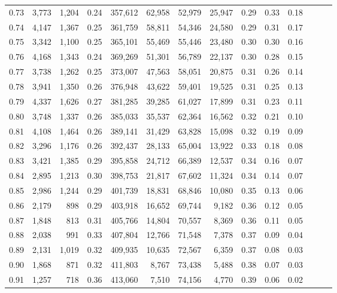 \begin{tabular}{rrrrrrrrrrrrrr}
0.73 &  3,773 &  1,204 &  0.24 &  357,612 &   62,958 &  52,979 &  25,947 &  0.29 &  0.33 &      0.18 \\
0.74 &  4,147 &  1,367 &  0.25 &  361,759 &   58,811 &  54,346 &  24,580 &  0.29 &  0.31 &      0.17 \\
0.75 &  3,342 &  1,100 &  0.25 &  365,101 &   55,469 &  55,446 &  23,480 &  0.30 &  0.30 &      0.16 \\
0.76 &  4,168 &  1,343 &  0.24 &  369,269 &   51,301 &  56,789 &  22,137 &  0.30 &  0.28 &      0.15 \\
0.77 &  3,738 &  1,262 &  0.25 &  373,007 &   47,563 &  58,051 &  20,875 &  0.31 &  0.26 &      0.14 \\
0.78 &  3,941 &  1,350 &  0.26 &  376,948 &   43,622 &  59,401 &  19,525 &  0.31 &  0.25 &      0.13 \\
0.79 &  4,337 &  1,626 &  0.27 &  381,285 &   39,285 &  61,027 &  17,899 &  0.31 &  0.23 &      0.11 \\
0.80 &  3,748 &  1,337 &  0.26 &  385,033 &   35,537 &  62,364 &  16,562 &  0.32 &  0.21 &      0.10 \\
0.81 &  4,108 &  1,464 &  0.26 &  389,141 &   31,429 &  63,828 &  15,098 &  0.32 &  0.19 &      0.09 \\
0.82 &  3,296 &  1,176 &  0.26 &  392,437 &   28,133 &  65,004 &  13,922 &  0.33 &  0.18 &      0.08 \\
0.83 &  3,421 &  1,385 &  0.29 &  395,858 &   24,712 &  66,389 &  12,537 &  0.34 &  0.16 &      0.07 \\
0.84 &  2,895 &  1,213 &  0.30 &  398,753 &   21,817 &  67,602 &  11,324 &  0.34 &  0.14 &      0.07 \\
0.85 &  2,986 &  1,244 &  0.29 &  401,739 &   18,831 &  68,846 &  10,080 &  0.35 &  0.13 &      0.06 \\
0.86 &  2,179 &    898 &  0.29 &  403,918 &   16,652 &  69,744 &   9,182 &  0.36 &  0.12 &      0.05 \\
0.87 &  1,848 &    813 &  0.31 &  405,766 &   14,804 &  70,557 &   8,369 &  0.36 &  0.11 &      0.05 \\
0.88 &  2,038 &    991 &  0.33 &  407,804 &   12,766 &  71,548 &   7,378 &  0.37 &  0.09 &      0.04 \\
0.89 &  2,131 &  1,019 &  0.32 &  409,935 &   10,635 &  72,567 &   6,359 &  0.37 &  0.08 &      0.03 \\
0.90 &  1,868 &    871 &  0.32 &  411,803 &    8,767 &  73,438 &   5,488 &  0.38 &  0.07 &      0.03 \\
0.91 &  1,257 &    718 &  0.36 &  413,060 &    7,510 &  74,156 &   4,770 &  0.39 &  0.06 &      0.02 \\

\end{tabular}
